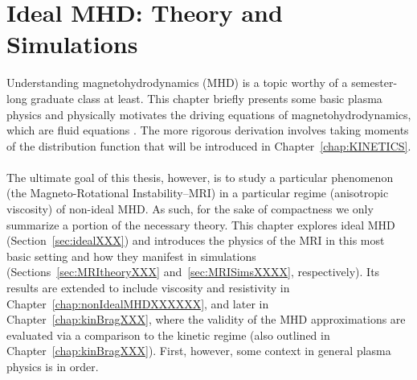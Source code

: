 \chapter{Ideal MHD: Theory and Simulations}
Understanding magnetohydrodynamics (MHD) is a topic worthy of a semester-long graduate class at least. This chapter briefly presents some basic plasma physics and physically motivates the driving equations of magnetohydrodynamics, which are fluid equations . The more rigorous derivation involves taking moments of the distribution function that will be introduced in Chapter~\ref{chap:KINETICS}.\\
\\
The ultimate goal of this thesis, however, is to study a particular phenomenon (the Magneto-Rotational Instability--MRI) in a particular regime (anisotropic viscosity) of non-ideal MHD. As such, for the sake of compactness we only summarize a portion of the necessary theory. This chapter explores ideal MHD (Section~\ref{sec:idealXXX}) and introduces the physics of the MRI in this most basic setting and how they manifest in simulations (Sections~\ref{sec:MRItheoryXXX} and~\ref{sec:MRISimsXXXX}, respectively). Its results are extended to include viscosity and resistivity in Chapter~\ref{chap:nonIdealMHDXXXXXX}, and later in Chapter~\ref{chap:kinBragXXX}, where the validity of the MHD approximations are evaluated via a comparison to the kinetic regime (also outlined in Chapter~\ref{chap:kinBragXXX}). First, however, some context in general plasma physics is in order. 

